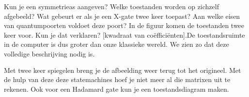 \documentclass[../../main.tex]{subfiles}
\begin{document}
\begin{center}
\end{center}

\normal Kun je een symmetrieas aangeven? Welke toestanden worden op zichzelf afgebeeld?
Wat gebeurt er als je een X-gate twee keer toepast? Aan welke eisen van quantumpoorten voldoet deze poort?
In de figuur komen de toestanden twee keer voor.  Kun je dat verklaren? [kwadraat van co\"effici\"enten].De toestandsruimte in de computer is dus groter dan onze klassieke wereld. We zien zo dat deze volledige beschrijving nodig is.

Met twee keer spiegelen breng je de afbeelding weer terug tot het origineel. Met de hulp van deze deze statemachines hoef je niet meer al die matrixen uit te rekenen. 
Ook voor een Hadamard gate kun je een toestandsdiagram maken. 
\end{document}
